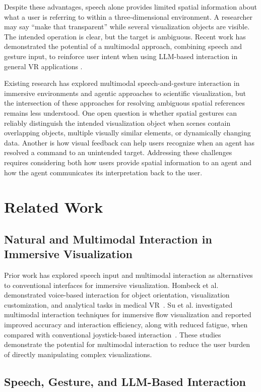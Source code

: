 \documentclass[sigconf,nonacm]{acmart}
\begin{document}
Despite these advantages, speech alone provides limited spatial information about what a user is referring to within a three-dimensional environment. A researcher may say “make that transparent” while several visualization objects are visible. The intended operation is clear, but the target is ambiguous. Recent work has demonstrated the potential of a multimodal approach, combining speech and gesture input, to reinforce user intent when using LLM-based interaction in general VR applications \cite{hu2025gesprompt}.

Existing research has explored multimodal speech-and-gesture interaction in immersive environments and agentic approaches to scientific visualization, but the intersection of these approaches for resolving ambiguous spatial references remains less understood. One open question is whether spatial gestures can reliably distinguish the intended visualization object when scenes contain overlapping objects, multiple visually similar elements, or dynamically changing data. Another is how visual feedback can help users recognize when an agent has resolved a command to an unintended target. Addressing these challenges requires considering both how users provide spatial information to an agent and how the agent communicates its interpretation back to the user.


\section{Related Work}
\subsection{Natural and Multimodal Interaction in Immersive Visualization}

Prior work has explored speech input and multimodal interaction as alternatives to conventional interfaces for immersive visualization. Hombeck et al. demonstrated voice-based interaction for object orientation, visualization customization, and analytical tasks in medical VR~\cite{hombeck2024voice}. Su et al. investigated multimodal interaction techniques for immersive flow visualization and reported improved accuracy and interaction efficiency, along with reduced fatigue, when compared with conventional joystick-based interaction~\cite{su2021natural}. These studies demonstrate the potential for multimodal interaction to reduce the user burden of directly manipulating complex visualizations. 

\subsection{Speech, Gesture, and LLM-Based Interaction}
\end{document}
